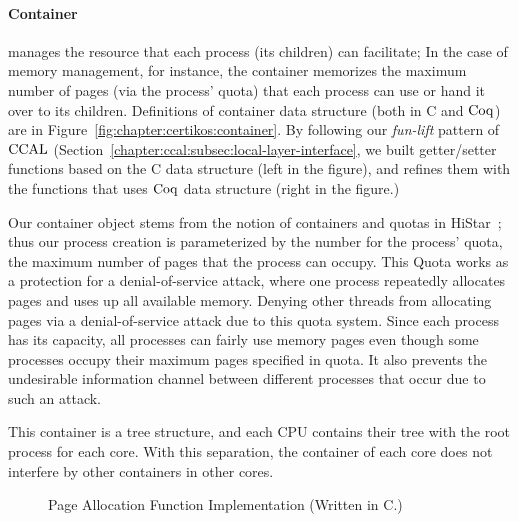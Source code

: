 \paragraph{Container} manages the resource that each process (its children) can facilitate; 
In the case of memory management, for instance,
the container memorizes the maximum number of pages (via the process' quota) 
that each process can use or hand it over to its children.
Definitions of container data structure (both in C and $\mathrm{Coq}$) are in 
Figure~\ref{fig:chapter:certikos:container}. 
By following our \textit{fun-lift} pattern of $\mathrm{CCAL}$ (Section~\ref{chapter:ccal:subsec:local-layer-interface}, 
we built getter/setter functions based on the C data structure (left in the figure), 
and refines them with the functions that uses $\mathrm{Coq}$ data structure (right in the figure.)

Our container object stems from the notion of containers and quotas in HiStar~\cite{zeldovich06};
thus our process creation is parameterized by the number for the process' quota, the maximum number of pages that 
the process can occupy.
This Quota works as a protection for a denial-of-service attack, where one process repeatedly allocates pages and uses up all available memory. 
Denying other threads from allocating pages via a denial-of-service attack due to this quota system. 
Since each process has its capacity, all processes can fairly use memory pages even though some processes occupy their maximum pages specified in quota. 
It also prevents the undesirable information channel between different processes that occur due to such an attack.

This container is a tree structure, and each CPU contains their tree with the root process for each core. 
With this separation, the container of each core does not interfere by other containers in other cores. 


\begin{figure}
 
\caption{Page Allocation Function Implementation (Written in C.)}
\label{fig:chapter:certikos:palloc-in-c}
\end{figure}

